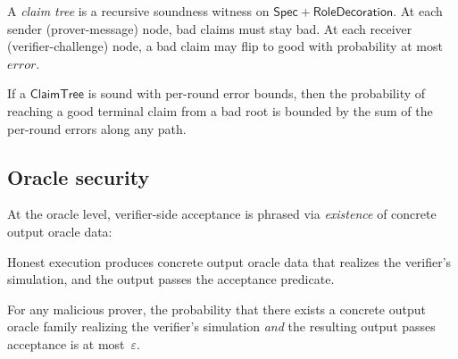 \begin{definition}
  \label{int:claim-tree}
  A \emph{claim tree} is a recursive soundness witness on $\mathsf{Spec} +
  \mathsf{RoleDecoration}$.  At each sender (prover-message) node, bad claims
  must stay bad.  At each receiver (verifier-challenge) node, a bad claim may
  flip to good with probability at most $\mathit{error}$.
\end{definition}

\begin{theorem}
  \label{thm:bound-terminal-prob}
  If a $\mathsf{ClaimTree}$ is sound with per-round error bounds, then the
  probability of reaching a good terminal claim from a bad root is bounded by
  the sum of the per-round errors along any path.
\end{theorem}

\subsection{Oracle security}

At the oracle level, verifier-side acceptance is phrased via \emph{existence}
of concrete output oracle data:

\begin{definition}
  \label{int:oracle-completeness}
  Honest execution produces concrete output oracle data that realizes the
  verifier's simulation, and the output passes the acceptance predicate.
\end{definition}

\begin{definition}
  \label{int:oracle-soundness}
  For any malicious prover, the probability that there exists a concrete output
  oracle family realizing the verifier's simulation \emph{and} the resulting
  output passes acceptance is at most~$\varepsilon$.
\end{definition}
